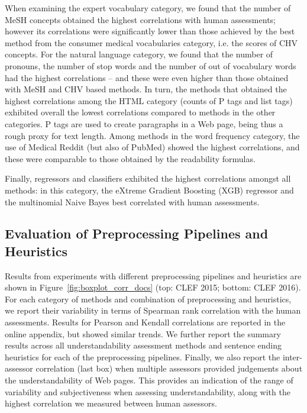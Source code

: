 When examining the expert vocabulary category, we found that the number of MeSH concepts obtained the highest correlations with human assessments; however its correlations were significantly lower than those achieved by the best method from the consumer medical vocabularies category, i.e. the scores of CHV concepts. For the natural language category, we found that the number of pronouns, the number of stop words and the number of out of vocabulary words had the highest correlations -- and these were even higher than those obtained with MeSH and CHV based methods. In turn, the methods that obtained the highest correlations among the HTML category (counts of P tags and list tags) exhibited overall the lowest correlations compared to methods in the other categories. P tags are used to create paragraphs in a Web page, being thus a rough proxy for text length. 
Among methods in the word frequency category, the use of Medical Reddit (but also of PubMed) showed the highest correlations, and these were comparable to those obtained by the readability formulas. 

Finally, regressors and classifiers exhibited the highest correlations amongst all methods: in this  category, the  eXtreme Gradient Boosting (XGB) regressor and the multinomial Naive Bayes best correlated with human assessments. 

\subsection*{Evaluation of Preprocessing Pipelines and Heuristics}
\label{sec:which_preprocessing}

Results from experiments with different preprocessing pipelines and heuristics are shown in Figure~\ref{fig:boxplot_corr_docs} (top: CLEF 2015; bottom: CLEF 2016). 
For each category of methods and combination of preprocessing and heuristics, we report their variability in terms of Spearman rank correlation with the human assessments. Results for Pearson and Kendall correlations are reported in the online appendix, but showed similar trends. 
We further report the summary results across all understandability assessment methods and sentence ending heuristics for each of the preprocessing pipelines. 
Finally, we also report the inter-assessor correlation (last box) when multiple assessors provided judgements about the understandability of Web pages. %
This provides an indication of the range of variability and subjectiveness when assessing understandability, along with the highest correlation we measured between human assessors. 

